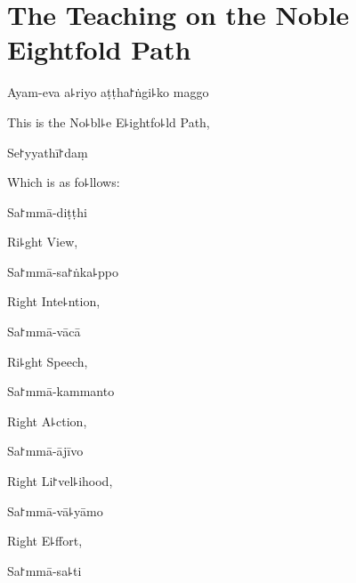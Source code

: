 
\chapter[The Noble Eightfold Path]{The Teaching on the Noble Eightfold Path}%


\begin{leader}
\end{leader}

Ayam-eva a꜕riyo aṭṭha꜓ṅgi꜕ko maggo

\begin{english}
  This is the No꜕bl꜕e E꜕ightfo꜕ld Path,
\end{english}

Se꜓yyathī꜓daṃ

\begin{english}
  Which is as fo꜕llows:
\end{english}

Sa꜓mmā-diṭṭhi

\begin{english}
  Ri꜕ght View,
\end{english}

Sa꜓mmā-sa꜓ṅka꜕ppo

\begin{english}
  Right Inte꜕ntion,
\end{english}

Sa꜓mmā-vācā

\begin{english}
  Ri꜕ght Speech,
\end{english}

Sa꜓mmā-kammanto

\begin{english}
  Right A꜕ction,
\end{english}

Sa꜓mmā-ājīvo

\begin{english}
  Right Li꜓vel꜕ihood,
\end{english}

Sa꜓mmā-vā꜕yāmo

\begin{english}
  Right E꜕ffort,
\end{english}

\ifaivedition
\clearpage
\fi

Sa꜓mmā-sa꜕ti

